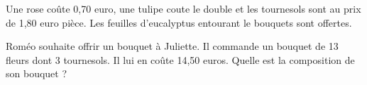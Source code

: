 
Une rose coûte 0,70 euro, une tulipe coute le double et les tournesols sont au prix de 1,80 euro pièce. Les feuilles d'eucalyptus entourant le bouquets sont offertes.

Roméo souhaite offrir un bouquet à Juliette. Il commande un bouquet de 13 fleurs dont 3 tournesols. Il lui en coûte 14,50 euros. Quelle est la composition de son bouquet ?